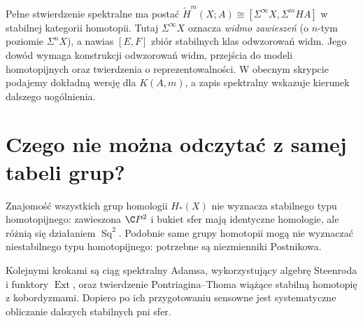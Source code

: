 \begin{uwaga}
Pełne stwierdzenie spektralne ma postać
$\widetilde H^m(X;A)\cong[\Sigma^\infty X,\Sigma^mHA]$
w stabilnej kategorii homotopii. Tutaj
$\Sigma^\infty X$ oznacza \emph{widmo zawieszeń}
(o $n$-tym poziomie $\Sigma^nX$), a nawias
$[E,F]$ zbiór stabilnych klas odwzorowań widm. Jego dowód wymaga
konstrukcji odwzorowań widm, przejścia do modeli
homotopijnych oraz twierdzenia o reprezentowalności.
W obecnym skrypcie podajemy dokładną wersję dla
$K(A,m)$, a zapis spektralny wskazuje kierunek
dalszego uogólnienia.
\end{uwaga}

\section{Czego nie można odczytać z samej tabeli grup?}
Znajomość wszystkich grup homologii $H_*(X)$ nie
wyznacza stabilnego typu homotopijnego: zawieszona
$\C P^2$ i bukiet sfer mają identyczne homologie,
ale różnią się działaniem $\operatorname{Sq}^2$.
Podobnie same grupy homotopii mogą nie wyznaczać
niestabilnego typu homotopijnego: potrzebne są
niezmienniki Postnikowa.

Kolejnymi krokami są ciąg spektralny Adamsa,
wykorzystujący algebrę Steenroda i funktory $\operatorname{Ext}$,
oraz twierdzenie Pontriagina--Thoma wiążące
stabilną homotopię z kobordyzmami. Dopiero po ich
przygotowaniu sensowne jest systematyczne
obliczanie dalszych stabilnych pni sfer.


